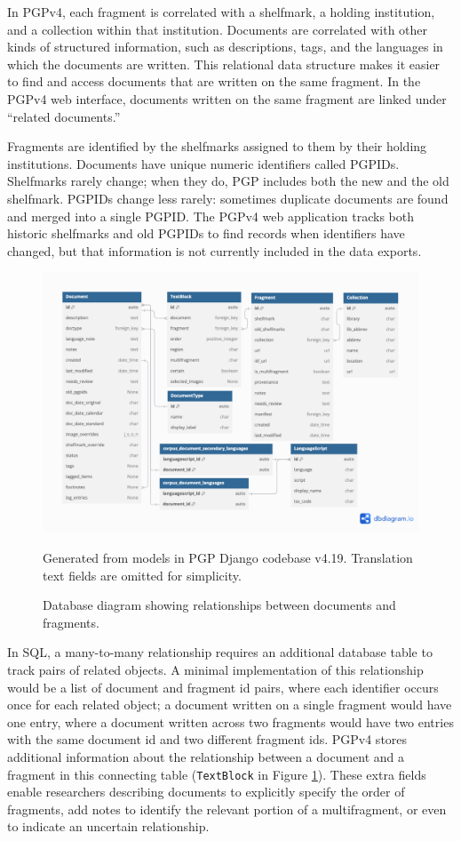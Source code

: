 \documentclass{article}
\begin{document}
In PGPv4, each fragment is correlated with a shelfmark, a holding institution, and a collection within that institution. Documents are correlated with other kinds of structured information, such as descriptions, tags, and the languages in which the documents are written. This relational data structure makes it easier to find and access documents that are written on the same fragment. In the PGPv4 web interface, documents written on the same fragment are linked under “related documents.”

Fragments are identified by the shelfmarks assigned to them by their holding institutions. Documents have unique numeric identifiers called PGPIDs. Shelfmarks rarely change; when they do, PGP includes both the new and the old shelfmark. PGPIDs change less rarely: sometimes duplicate documents are found and merged into a single PGPID. The PGPv4 web application tracks both historic shelfmarks and old PGPIDs to find records when identifiers have changed, but that information is not currently included in the data exports.

\begin{figure}[!hbt]
  \includegraphics[width=1\linewidth]{db-diagrams/pgp v4.19 documents.png}
  \centering
  \caption{Database diagram showing relationships between documents and fragments.}
  \medskip
    \small
  Generated from models in  PGP Django codebase v4.19. Translation text fields are omitted for simplicity.
  \label{fig:pgpv4_db_documents}
\end{figure}

In SQL, a many-to-many relationship requires an additional database table to track pairs of related objects. A minimal implementation of this relationship would be a list of document and fragment id pairs, where each identifier occurs once for each related object; a document written on a single fragment would have one entry, where a document written across two fragments would have two entries with the same document id and two different fragment ids.  PGPv4 stores additional information about the relationship between a document and a fragment in this connecting table (\texttt{TextBlock} in Figure \ref{fig:pgpv4_db_documents}). These extra fields enable researchers describing documents to explicitly specify the order of fragments, add notes to identify the relevant portion of a multifragment, or even to indicate an uncertain relationship. 
\end{document}
